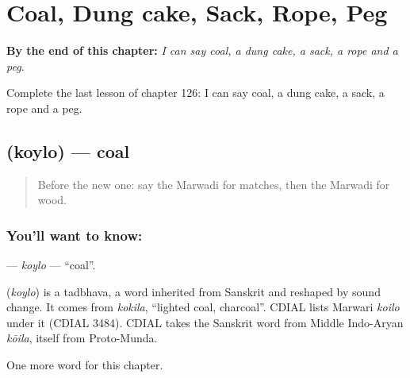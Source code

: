 
\chapter{Coal, Dung cake, Sack, Rope, Peg}
\label{ch:mw-coal-dung-cake-sack-rope-peg}

\begin{chapteropening}
\textbf{By the end of this chapter:} \emph{I can say coal, a dung cake, a sack, a rope and a peg.}

Complete the last lesson of chapter 126: I can say coal, a dung cake, a sack, a rope and a peg.
\end{chapteropening}

\section[\texorpdfstring{\mw{कोयलो} (koylo)}{कोयलो (koylo)}]{ (koylo) — coal}

\label{lesson:MW-C126-koylo}



\begin{quote}
Before the new one: say the Marwadi for matches, then the Marwadi for wood.
\end{quote}

\subsection*{You'll want to know: }
\textbf{} — \emph{koylo} — \textquotedblleft{}coal\textquotedblright{}.

\begin{cousinweb}
\textbf{} (\emph{koylo}) is a tadbhava, a word inherited from Sanskrit and reshaped by sound change. It comes from \emph{kokila}, \textquotedblleft{}lighted coal, charcoal\textquotedblright{}. CDIAL lists Marwari \emph{koilo} under it (CDIAL 3484). CDIAL takes the Sanskrit word from Middle Indo-Aryan \emph{kōila}, itself from Proto-Munda.
\end{cousinweb}

\begin{grammarlens}[title={What you've built}]
One more word for this chapter.
\end{grammarlens}


